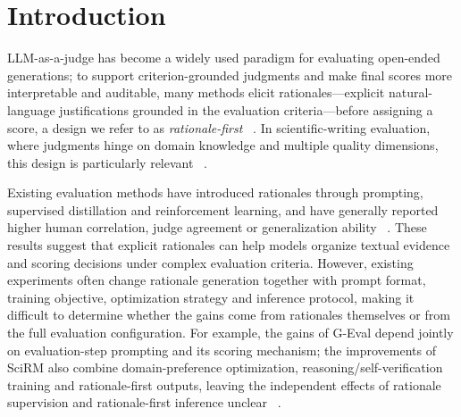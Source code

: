 \section{Introduction}
\label{sec:introduction}


LLM-as-a-judge has become a widely used paradigm for evaluating open-ended generations;
to support criterion-grounded judgments and make final scores more interpretable and auditable,
many methods elicit rationales---explicit natural-language justifications
grounded in the evaluation criteria---before assigning a score,
a design we refer to as \emph{rationale-first}
~\citep{liu-etal-2023-g,kim-etal-2024-prometheus-iclr}.
In scientific-writing evaluation, where judgments hinge on
domain knowledge and multiple quality dimensions,
this design is particularly relevant
~\citep{sadallah-etal-2025-good,sahinuc-etal-2026-reward,zhang-etal-2026-surveyreview}.


Existing evaluation methods have introduced rationales through prompting,
supervised distillation and reinforcement learning,
and have generally reported higher human correlation, judge agreement or generalization ability
~\citep{liu-etal-2023-g,kim-etal-2024-prometheus-iclr,sahinuc-etal-2026-reward}.
These results suggest that explicit rationales can help models organize textual evidence
and scoring decisions under complex evaluation criteria.
However, existing experiments often change rationale generation together with prompt format,
training objective, optimization strategy and inference protocol,
making it difficult to determine whether the gains come from rationales themselves
or from the full evaluation configuration.
For example, the gains of G-Eval depend jointly on evaluation-step prompting and its scoring mechanism;
the improvements of SciRM also combine domain-preference optimization,
reasoning/self-verification training and rationale-first outputs,
leaving the independent effects of rationale supervision and rationale-first inference unclear
~\citep{liu-etal-2023-g,sahinuc-etal-2026-reward}.

